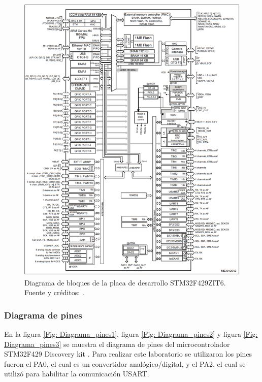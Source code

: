 \begin{figure}[H]
    \centering
    \includegraphics[width=14cm]{Imagenes/Diagrama_Bolques.png}
    \caption{Diagrama de bloques de la placa de desarrollo STM32F429ZIT6. Fuente y créditos: \cite{datasheet}.}
    \label{mcu-diagram}
\end{figure}


\subsubsection{Diagrama de pines}

En la figura \ref{Fig: Diagrama_pines1}, figura \ref{Fig: Diagrama_pines2} y figura \ref{Fig: Diagrama_pines3} se muestra el diagrama de pines del microcontrolador STM32F429 Discovery kit \cite{st-discovery-f429zi}. Para realizar este laboratorio se utilizaron los pines fueron el PA0, el cual es un convertidor analógico/digital, y el PA2, el cual se utilizó para habilitar la comunicación USART.


